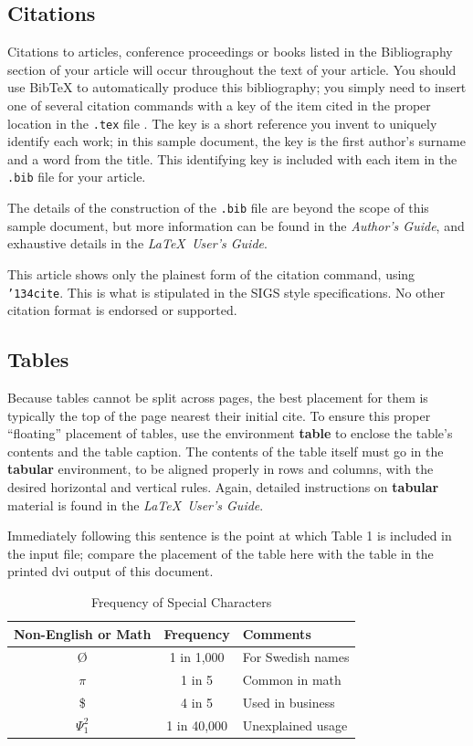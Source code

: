 \documentclass{sig-alternate-05-2015}
\begin{document}
\subsection{Citations}
Citations to articles,
conference proceedings or
books listed
in the Bibliography section of your
article will occur throughout the text of your article.
You should use BibTeX to automatically produce this bibliography;
you simply need to insert one of several citation commands with
a key of the item cited in the proper location in
the \texttt{.tex} file .
The key is a short reference you invent to uniquely
identify each work; in this sample document, the key is
the first author's surname and a
word from the title.  This identifying key is included
with each item in the \texttt{.bib} file for your article.

The details of the construction of the \texttt{.bib} file
are beyond the scope of this sample document, but more
information can be found in the \textit{Author's Guide},
and exhaustive details in the \textit{\LaTeX\ User's
Guide}.

This article shows only the plainest form
of the citation command, using \texttt{{\char'134}cite}.
This is what is stipulated in the SIGS style specifications.
No other citation format is endorsed or supported.

\subsection{Tables}
Because tables cannot be split across pages, the best
placement for them is typically the top of the page
nearest their initial cite.  To
ensure this proper ``floating'' placement of tables, use the
environment \textbf{table} to enclose the table's contents and
the table caption.  The contents of the table itself must go
in the \textbf{tabular} environment, to
be aligned properly in rows and columns, with the desired
horizontal and vertical rules.  Again, detailed instructions
on \textbf{tabular} material
is found in the \textit{\LaTeX\ User's Guide}.

Immediately following this sentence is the point at which
Table 1 is included in the input file; compare the
placement of the table here with the table in the printed
dvi output of this document.

\begin{table}
\centering
\caption{Frequency of Special Characters}
\begin{tabular}{|c|c|l|} \hline
Non-English or Math&Frequency&Comments\\ \hline
\O & 1 in 1,000& For Swedish names\\ \hline
$\pi$ & 1 in 5& Common in math\\ \hline
\$ & 4 in 5 & Used in business\\ \hline
$\Psi^2_1$ & 1 in 40,000& Unexplained usage\\
\hline\end{tabular}
\end{table}
\end{document}
